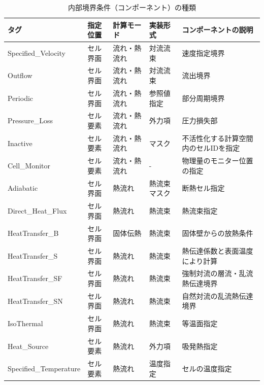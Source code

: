 \begin{table}[htdp]
\caption{内部境界条件（コンポーネント）の種類}
\begin{center}
\small
\begin{tabular}{lllll} \toprule
タグ & 指定位置 & 計算モード & 実装形式 & コンポーネントの説明\\ \midrule
Specified\_Velocity & セル界面 & 流れ・熱流れ & 対流流束 & 速度指定境界\footnotemark[1]\\
Outflow & セル界面 & 流れ・熱流れ & 対流流束 & 流出境界\\
Periodic & セル界面 & 流れ・熱流れ & 参照値指定 & 部分周期境界\\
Pressure\_Loss & セル要素 & 流れ・熱流れ & 外力項 & 圧力損失部\\
Inactive & セル要素 & 流れ・熱流れ & マスク & 不活性化する計算空間内のセルIDを指定\\
Cell\_Monitor & セル要素 & 流れ・熱流れ & - & 物理量のモニター位置の指定\footnotemark[2]\\ \hline
Adiabatic & セル界面 & 熱流れ & 熱流束マスク & 断熱セル指定\\
Direct\_Heat\_Flux & セル界面 & 熱流れ & 熱流束 & 熱流束指定\\
HeatTransfer\_B & セル界面 & 固体伝熱 & 熱流束 & 固体壁からの放熱条件\\
HeatTransfer\_S & セル界面 & 熱流れ & 熱流束 & 熱伝達係数と表面温度により計算\\
HeatTransfer\_SF & セル界面 & 熱流れ & 熱流束 & 強制対流の層流・乱流熱伝達境界\\
HeatTransfer\_SN & セル界面 & 熱流れ & 熱流束 & 自然対流の乱流熱伝達境界\\
IsoThermal & セル界面 & 熱流れ & 熱流束 & 等温面指定\\
Heat\_Source & セル要素 & 熱流れ & 外力項 & 吸発熱指定\\
Specified\_Temperature & セル要素 & 熱流れ & 温度指定 & セルの温度指定\\
\bottomrule
\end{tabular}
\end{center}
\label{tbl:tag_ibc}
\end{table}

